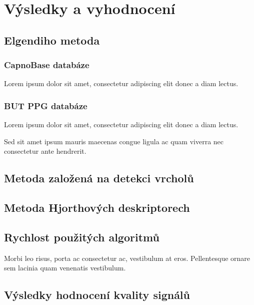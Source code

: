 \chapter{Výsledky a vyhodnocení}
\label{ch:vysledky}

\section{Elgendiho metoda}
\label{sec:vysledky_elgendi}

\subsection*{CapnoBase databáze}
Lorem ipsum dolor sit amet, consectetur adipiscing elit donec a diam lectus.

\subsection*{BUT PPG databáze}
Lorem ipsum dolor sit amet, consectetur adipiscing elit donec a diam lectus.

Sed sit amet ipsum mauris maecenas congue ligula ac quam viverra nec consectetur ante hendrerit.

\section{Metoda založená na detekci vrcholů}
\label{sec:vysledky_vlastni}

\section{Metoda Hjorthových deskriptorech}
\label{sec:vysledky_hjorth}

\section{Rychlost použitých algoritmů}
\label{sec:rychlost_zpracovani}
Morbi leo risus, porta ac consectetur ac, vestibulum at eros.
Pellentesque ornare sem lacinia quam venenatis vestibulum.

\section{Výsledky hodnocení kvality signálů}